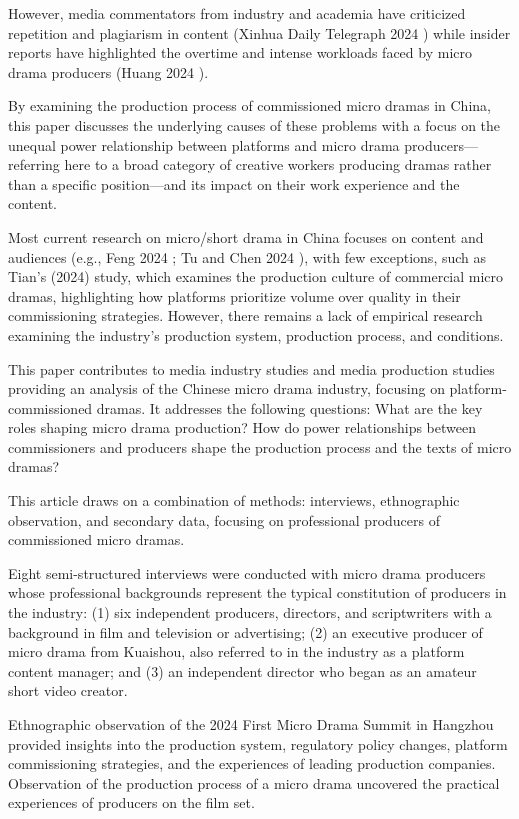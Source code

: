 \documentclass[10pt,a4paper]{article}
\begin{document}
However, media commentators from industry and academia have criticized repetition and plagiarism in content (Xinhua Daily Telegraph 2024 ) while insider reports have highlighted the overtime and intense workloads faced by micro drama producers (Huang 2024 ).\par
By examining the production process of commissioned micro dramas in China, this paper discusses the underlying causes of these problems with a focus on the unequal power relationship between platforms and micro drama producers—referring here to a broad category of creative workers producing dramas rather than a specific position—and its impact on their work experience and the content.\par
Most current research on micro/short drama in China focuses on content and audiences (e.g., Feng 2024 ; Tu and Chen 2024 ), with few exceptions, such as Tian’s (2024) study, which examines the production culture of commercial micro dramas, highlighting how platforms prioritize volume over quality in their commissioning strategies. However, there remains a lack of empirical research examining the industry’s production system, production process, and conditions.\par
This paper contributes to media industry studies and media production studies providing an analysis of the Chinese micro drama industry, focusing on platform-commissioned dramas. It addresses the following questions: What are the key roles shaping micro drama production? How do power relationships between commissioners and producers shape the production process and the texts of micro dramas?\par
This article draws on a combination of methods: interviews, ethnographic observation, and secondary data, focusing on professional producers of commissioned micro dramas.\par
Eight semi-structured interviews were conducted with micro drama producers whose professional backgrounds represent the typical constitution of producers in the industry: (1) six independent producers, directors, and scriptwriters with a background in film and television or advertising; (2) an executive producer of micro drama from Kuaishou, also referred to in the industry as a platform content manager; and (3) an independent director who began as an amateur short video creator.\par
Ethnographic observation of the 2024 First Micro Drama Summit in Hangzhou provided insights into the production system, regulatory policy changes, platform commissioning strategies, and the experiences of leading production companies. Observation of the production process of a micro drama uncovered the practical experiences of producers on the film set.\par
\end{document}
